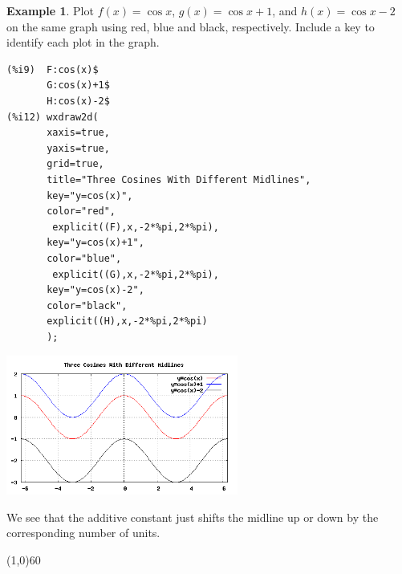 \documentclass[10.5pt,twoside]{report}
\theoremstyle{definition}
\newtheorem{exmp}{Example}[section]
\begin{document}
\begin{exmp}

Plot $f(x)=\cos{x}$, $g(x)=\cos{x}+1$, and $h(x)=\cos{x}-2$ on the same graph using red, blue and black, respectively.  Include a key to identify each plot in the graph.\\


\begin{verbatim}
(%i9)  F:cos(x)$
       G:cos(x)+1$
       H:cos(x)-2$
(%i12) wxdraw2d(
       xaxis=true,
       yaxis=true,
       grid=true,
       title="Three Cosines With Different Midlines",
       key="y=cos(x)",
       color="red",
        explicit((F),x,-2*%pi,2*%pi),
       key="y=cos(x)+1",
       color="blue",
        explicit((G),x,-2*%pi,2*%pi),
       key="y=cos(x)-2",
       color="black",
       explicit((H),x,-2*%pi,2*%pi)
       );
\end{verbatim}

\includegraphics[width=3in]{example_1_2_3}

We see that the additive constant just shifts the midline up or down by the corresponding number of units.

\end{exmp}

\line(1,0){60}
\linethickness{0.5mm}
\end{document}
